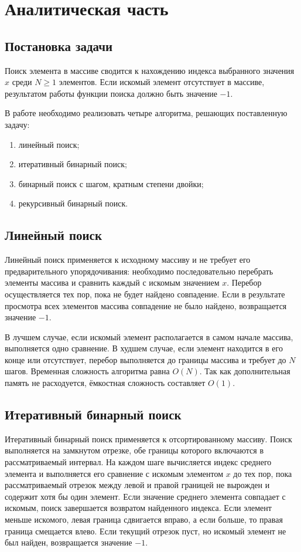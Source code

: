 \chapter{Аналитическая часть}

\section{Постановка задачи}

Поиск элемента в массиве сводится к нахождению индекса 
выбранного значения $x$ среди $N \ge 1$ элементов.
Если искомый элемент отсутствует в массиве, результатом работы 
функции поиска должно быть значение $-1$.

В работе необходимо реализовать четыре алгоритма, 
решающих поставленную задачу:
\begin{enumerate}
    \item линейный поиск;
    \item итеративный бинарный поиск;
    \item бинарный поиск с шагом, кратным степени двойки;
    \item рекурсивный бинарный поиск.
\end{enumerate}

\section{Линейный поиск}

Линейный поиск применяется к исходному массиву и не требует 
его предварительного упорядочивания: необходимо последовательно 
перебрать элементы массива и сравнить каждый с искомым значением $x$. 
Перебор осуществляется тех пор, пока не будет найдено совпадение. 
Если в результате просмотра всех элементов массива совпадение не 
было найдено, возвращается значение $-1$.

В лучшем случае, если искомый элемент располагается в самом 
начале массива, выполняется одно сравнение. В худшем случае, 
если элемент находится в его конце или отсутствует, перебор 
выполняется до границы массива и требует до $N$ шагов. Временная 
сложность алгоритма равна $O(N)$. Так как дополнительная память 
не расходуется, ёмкостная сложность составляет $O(1)$.

\section{Итеративный бинарный поиск}

Итеративный бинарный поиск применяется к отсортированному массиву. 
Поиск выполняется на замкнутом отрезке, обе границы которого 
включаются в рассматриваемый интервал. На каждом шаге вычисляется 
индекс среднего элемента и выполняется его сравнение с искомым 
элементом $x$ до тех пор, пока рассматриваемый отрезок между левой 
и правой границей не вырожден и содержит хотя бы один элемент. 
Если значение среднего элемента совпадает с искомым, поиск 
завершается возвратом найденного индекса. Если элемент меньше 
искомого, левая граница сдвигается вправо, а если больше, то правая 
граница смещается влево. Если текущий отрезок пуст, но искомый 
элемент не был найден, возвращается значение $-1$.

